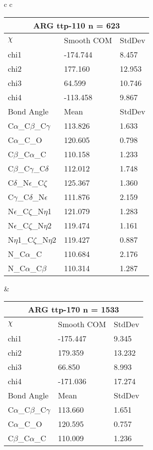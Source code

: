 \begin{longtable}{ c c }
  \\
  \begin{tabular}{ l l l }
  \toprule
  \multicolumn{3}{c}{ARG \textbf{ttp-110} n = 623} \\ \toprule
  $\chi$       & Smooth COM & StdDev \\ \midrule
  chi1 & -174.744 & 8.457 \\ 
  chi2 & 177.160 & 12.953 \\ 
  chi3 & 64.599 & 10.746 \\ 
  chi4 & -113.458 & 9.867 \\ \midrule
  Bond Angle   & Mean     & StdDev \\ \midrule
  C$\alpha$\_C$\beta$\_C$\gamma$ & 113.826 & 1.633\\
  C$\alpha$\_C\_O & 120.605 & 0.798\\
  C$\beta$\_C$\alpha$\_C & 110.158 & 1.233\\
  C$\beta$\_C$\gamma$\_C$\delta$ & 112.012 & 1.748\\
  C$\delta$\_N$\epsilon$\_C$\zeta$ & 125.367 & 1.360\\
  C$\gamma$\_C$\delta$\_N$\epsilon$ & 111.876 & 2.159\\
  N$\epsilon$\_C$\zeta$\_N$\eta$1 & 121.079 & 1.283\\
  N$\epsilon$\_C$\zeta$\_N$\eta$2 & 119.474 & 1.161\\
  N$\eta$1\_C$\zeta$\_N$\eta$2 & 119.427 & 0.887\\
  N\_C$\alpha$\_C & 110.684 & 2.176\\
  N\_C$\alpha$\_C$\beta$ & 110.314 & 1.287\\
  \bottomrule
  \end{tabular}
  &
  \begin{tabular}{ l l l }
  \toprule
  \multicolumn{3}{c}{ARG \textbf{ttp-170} n = 1533} \\ \toprule
  $\chi$       & Smooth COM & StdDev \\ \midrule
  chi1 & -175.447 & 9.345 \\ 
  chi2 & 179.359 & 13.232 \\ 
  chi3 & 66.850 & 8.993 \\ 
  chi4 & -171.036 & 17.274 \\ \midrule
  Bond Angle   & Mean     & StdDev \\ \midrule
  C$\alpha$\_C$\beta$\_C$\gamma$ & 113.660 & 1.651\\
  C$\alpha$\_C\_O & 120.595 & 0.757\\
  C$\beta$\_C$\alpha$\_C & 110.009 & 1.236\\

\end{tabular}
\end{longtable}
